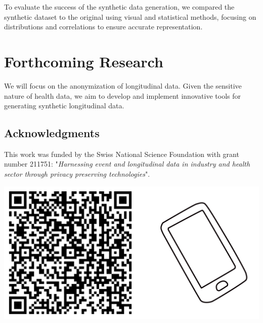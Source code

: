 \documentclass[a0,portrait]{a0poster}
\begin{document}
\begin{multicols}{3}
\vspace{1cm}
To evaluate the success of the synthetic data generation, we compared the synthetic dataset to the original using visual and statistical methods, focusing on distributions and correlations to ensure accurate representation.


\section{Forthcoming Research}

We will focus on the anonymization of longitudinal data.
Given the sensitive nature of health data, we aim to develop and implement innovative tools for generating synthetic longitudinal data.

\singlespacing
\small
\nocite{*} %

\subsection{Acknowledgments}
\normalsize
This work was funded by the Swiss National Science Foundation with grant number 211751: "\textit{Harnessing event and longitudinal data in industry and health sector through privacy preserving technologies}".

\vspace{0.5cm}

\includegraphics[width=1\linewidth]{Poster TEX/style/qr-code.png}
 
\end{multicols}
\end{document}
